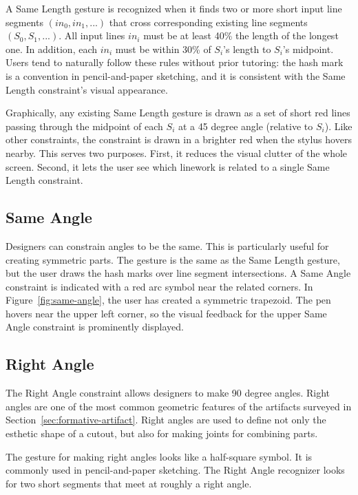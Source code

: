 A Same Length gesture is recognized when it finds two or more short
input line segments $(in_0, in_1, ...)$ that cross corresponding
existing line segments $(S_0, S_1, ...)$. All input lines $in_i$ must
be at least 40\% the length of the longest one. In addition, each
$in_i$ must be within 30\% of $S_i$'s length to $S_i$'s
midpoint. Users tend to naturally follow these rules without prior
tutoring: the hash mark is a convention in pencil-and-paper sketching,
and it is consistent with the Same Length constraint's visual
appearance.

Graphically, any existing Same Length gesture is drawn as a set of
short red lines passing through the midpoint of each $S_i$ at a 45
degree angle (relative to $S_i$). Like other constraints, the
constraint is drawn in a brighter red when the stylus hovers
nearby. This serves two purposes. First, it reduces the visual clutter
of the whole screen. Second, it lets the user see which linework is
related to a single Same Length constraint. 

\subsection{Same Angle}

Designers can constrain angles to be the same. This is particularly
useful for creating symmetric parts. The gesture is the same as the
Same Length gesture, but the user draws the hash marks over line
segment intersections. A Same Angle constraint is indicated with a red
arc symbol near the related corners. In Figure~\ref{fig:same-angle},
the user has created a symmetric trapezoid. The pen hovers near the
upper left corner, so the visual feedback for the upper Same Angle
constraint is prominently displayed.



\subsection{Right Angle}

The Right Angle constraint allows designers to make 90 degree
angles. Right angles are one of the most common geometric features of
the artifacts surveyed in Section~\ref{sec:formative-artifact}. Right
angles are used to define not only the esthetic shape of a cutout, but
also for making joints for combining parts.

The gesture for making right angles looks like a half-square
symbol. It is commonly used in pencil-and-paper sketching. The Right
Angle recognizer looks for two short segments that meet at roughly a
right angle. 


